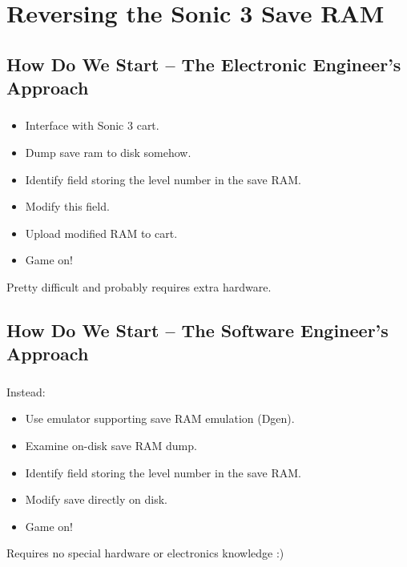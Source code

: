 \documentclass{beamer}
\begin{document}

\section{Reversing the Sonic 3 Save RAM}

\subsection{How Do We Start -- The Electronic Engineer's Approach}

\begin{frame}[fragile]
\frametitle{\insertsubsection}

\begin{itemize}
\item Interface with Sonic 3 cart.
\item Dump save ram to disk somehow.
\item Identify field storing the level number in the save RAM.
\item Modify this field.
\item Upload modified RAM to cart.
\item Game on!
\end{itemize}

Pretty difficult and probably requires extra hardware.

\end{frame}


\subsection{How Do We Start -- The Software Engineer's Approach}
\begin{frame}[fragile]
\frametitle{\insertsubsection}

Instead:

\begin{itemize}
\item Use emulator supporting save RAM emulation (Dgen).
\item Examine on-disk save RAM dump.
\item Identify field storing the level number in the save RAM.
\item Modify save directly on disk.
\item Game on!
\end{itemize}

\vfill

Requires no special hardware or electronics knowledge :)

\end{frame}
\end{document}
